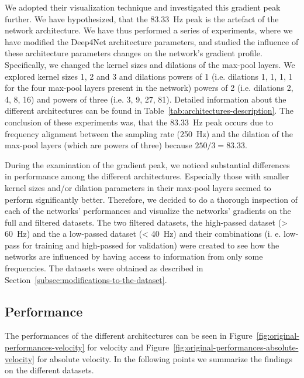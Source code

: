We adopted their visualization technique and investigated this gradient peak further. We have hypothesized, that the 83.33~Hz peak is the artefact of the network architecture. We have thus 
performed a series of experiments, where we have modified the Deep4Net architecture parameters, and 
studied the influence of these architecture parameters changes on the network's gradient profile.
Specifically, we changed the kernel sizes and dilations of the max-pool layers. We explored kernel sizes 1, 2 and 3 and dilations powers of 1 (i.e. dilations 1, 1, 1, 1  for the four max-pool layers present in the network) powers of 2 (i.e. dilations 2, 4, 8, 16) and powers of three (i.e. 3, 9, 27, 81). Detailed information about the different architectures can be found in Table~\ref{tab:architectures-description}.
The conclusion of these experiments was, that the 83.33~Hz peak occurs due to frequency alignment between the sampling rate (250~Hz) and the dilation of the max-pool layers (which are powers of three) because $ 250/3 = 83.33$.

During the examination of the gradient peak, we noticed substantial differences in performance among the different architectures.
Especially those with smaller kernel sizes and/or dilation parameters in their max-pool layers seemed to perform significantly better.
Therefore, we decided to do a thorough inspection of each of the networks' performances and visualize the networks' gradients on the full and filtered datasets. 
The two filtered datasets, the high-passed dataset (> 60~Hz) and the a low-passed dataset (< 40~Hz) and their combinations (i. e. low-pass for training and high-passed for validation) were created to see how the networks are influenced by having access to information from only some frequencies. The datasets were obtained as described in Section~\ref{subsec:modifications-to-the-dataset}.

\subsection{Performance}\label{subsec:performance}
The performances of the different architectures can be seen in Figure~\ref{fig:original-performances-velocity} for velocity and Figure~\ref{fig:original-performances-absolute-velocity} for absolute velocity.
In the following points we summarize the findings on the different datasets.

